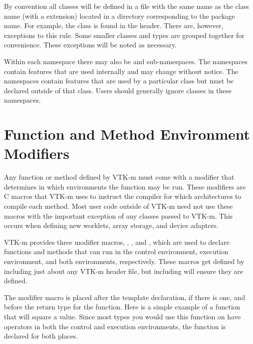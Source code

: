By convention all classes will be defined in a file with the same name as
the class name (with a  extension) located in a directory
corresponding to the package name. For example, the 
class is found in the  header. There
are, however, exceptions to this rule. Some smaller classes and types are
grouped together for convenience. These exceptions will be noted as
necessary.

Within each namespace there may also
be 
and 
sub-namespaces. The  namespaces contain features
that are used internally and may change without
notice. The  namespaces contain features that are
used by a particular class but must be declared outside of that
class. Users should generally ignore classes in these namespaces.



\section{Function and Method Environment Modifiers}
\label{sec:FunctionAndMethodEnvironmentModifiers}

Any function or method defined by VTK-m must come with a modifier that determines in which environments the function may be run.
These modifiers are C macros that VTK-m uses to instruct the compiler for which architectures to compile each method.
Most user code outside of VTK-m need not use these macros with the important exception of any classes passed to VTK-m.
This occurs when defining new worklets, array storage, and device adapters.

VTK-m provides three modifier macros, \vtkmcontmodifier, \vtkmexecmodifier, and
\vtkmexeccontmodifier, which are used to declare functions and methods that
can run in the control environment, execution environment, and both
environments, respectively. These macros get defined by including just
about any VTK-m header file, but including  will
ensure they are defined. 

The modifier macro is placed after the template declaration, if there is one,
and before the return type for the function. Here is a simple example of a
function that will square a value. Since most types you would use this
function on have operators in both the control and execution environments,
the function is declared for both places.

